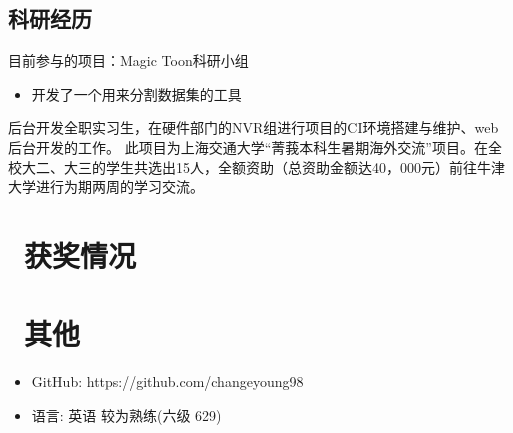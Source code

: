 \documentclass{resume}
\begin{document}
\subsection{\textbf{科研经历}}
目前参与的项目：Magic Toon科研小组
\begin{itemize}
  \item 开发了一个用来分割数据集的工具
\end{itemize}
后台开发全职实习生，在硬件部门的NVR组进行项目的CI环境搭建与维护、web后台开发的工作。
此项目为上海交通大学“菁莪本科生暑期海外交流”项目。在全校大二、大三的学生共选出15人，全额资助（总资助金额达40，000元）前往牛津大学进行为期两周的学习交流。




\section{\faHeartO\ 获奖情况}

\section{\faInfo\ 其他}
\begin{itemize}[parsep=0.5ex]
  \item GitHub: https://github.com/changeyoung98
  \item 语言: 英语 较为熟练(六级 629)
\end{itemize}

%
%
\end{document}
